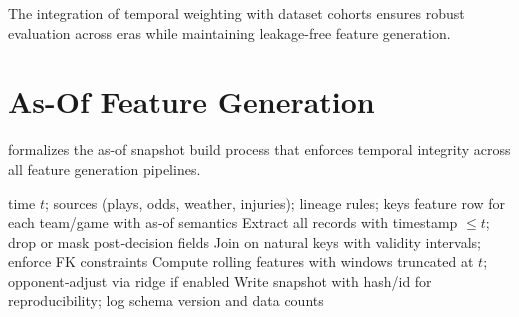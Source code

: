 The integration of temporal weighting with dataset cohorts ensures robust evaluation across eras while maintaining leakage-free feature generation.



\section{As-Of Feature Generation}
\label{sec:asof-generation}

 formalizes the as-of snapshot build process that enforces temporal integrity across all feature generation pipelines.

\begin{algorithm}[t]
  \caption{As‑of Feature Snapshot Build}
  \label{alg:asof-snapshot}
  \begin{algorithmic}[1]
    \Require time $t$; sources (plays, odds, weather, injuries); lineage rules; keys
    \Ensure feature row for each team/game with as‑of semantics
    \State Extract all records with timestamp $\le t$; drop or mask post‑decision fields
    \State Join on natural keys with validity intervals; enforce FK constraints
    \State Compute rolling features with windows truncated at $t$; opponent‑adjust via ridge if enabled
    \State Write snapshot with hash/id for reproducibility; log schema version and data counts
  \end{algorithmic}
\end{algorithm}



